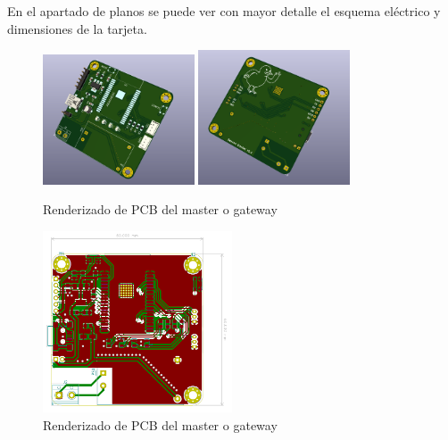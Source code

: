 \documentclass[paper=a4, fontsize=11pt,twoside]{scrartcl}	%
\begin{document}
        En el apartado de planos se puede ver con mayor detalle el esquema eléctrico y dimensiones de la tarjeta.
        \begin{center}
            \begin{figure}[ht]
                \centering
                \includegraphics[width=0.4\textwidth]{../receiver_1.PNG}
                \includegraphics[width=0.4\textwidth]{../receiver_2.PNG}
                \caption{Renderizado de PCB del master o gateway}
                \label{fig:mesh5}
            \end{figure}    
        \end{center}
        \begin{center}
            \begin{figure}[ht]
                \centering
                \includegraphics[width=0.5\textwidth]{../receiver_PCB.PNG}
                \caption{Renderizado de PCB del master o gateway}
                \label{fig:mesh6}
            \end{figure}    
        \end{center}
\end{document}
